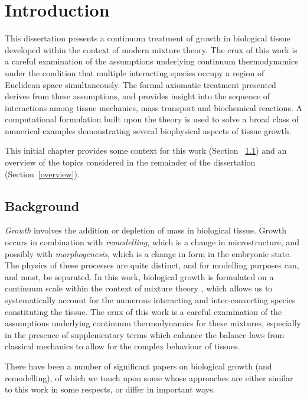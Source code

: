 \chapter{Introduction}
\label{introduction}

This dissertation presents a continuum treatment of growth in
biological tissue developed within the context of modern mixture
theory. The crux of this work is a careful examination of the
assumptions underlying continuum thermodynamics under the condition
that multiple interacting species occupy a region of Euclidean space
simultaneously. The formal axiomatic treatment presented derives from
these assumptions, and provides insight into the sequence of
interactions among tissue mechanics, mass transport and biochemical
reactions. A computational formulation built upon the theory is used
to solve a broad class of numerical examples demonstrating several
biophysical aspects of tissue growth.

This initial chapter provides some context for this work (Section%
~\ref{background}) and an overview of the topics considered in the
remainder of the dissertation (Section~\ref{overview}).

\section{Background}
\label{background}

\emph{Growth} involves the addition or depletion of mass in biological
tissue. Growth occurs in combination with \emph{remodelling}, which is
a change in microstructure, and possibly with \emph{morphogenesis},
which is a change in form in the embryonic state. The physics of these
processes are quite distinct, and for modelling purposes can, and
must, be separated. In this work, biological growth is formulated on a
continuum scale within the context of mixture theory \citep{Truesdell%
  Toupin:60, TruesdellNoll:65, BedfordDrumheller:1983}, which allows
us to systematically account for the numerous interacting and
inter-converting species constituting the tissue. The crux of this
work is a careful examination of the assumptions underlying continuum
thermodynamics for these mixtures, especially in the presence of
supplementary terms which enhance the balance laws from classical
mechanics to allow for the complex behaviour of tissues.

There have been a number of significant papers on biological growth
(and remodelling), of which we touch upon some whose approaches are
either similar to this work in some respects, or differ in important
ways.

